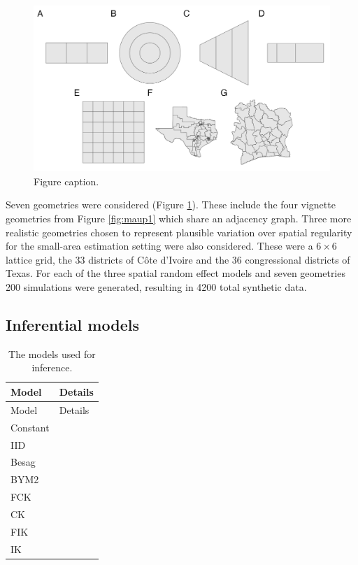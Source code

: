 \documentclass[a4paper, nobind]{templates/ociamthesis}
\begin{document}
\begin{figure}
\includegraphics[width=0.95\linewidth]{figures/beyond-borders/geometries} \caption{Figure caption.}\label{fig:geometries}
\end{figure}

Seven geometries were considered (Figure \ref{fig:geometries}).
These include the four vignette geometries from Figure \ref{fig:maup1} which share an adjacency graph.
Three more realistic geometries chosen to represent plausible variation over spatial regularity for the small-area estimation setting were also considered.
These were a \(6 \times 6\) lattice grid, the 33 districts of Côte d'Ivoire and the 36 congressional districts of Texas.
For each of the three spatial random effect models and seven geometries 200 simulations were generated, resulting in 4200 total synthetic data.

\hypertarget{inferential-models}{%
\subsection{Inferential models}\label{inferential-models}}

\begin{longtable}[]{@{}ll@{}}
\caption{\label{tab:inferential-models} The models used for inference.}\tabularnewline
\toprule\noalign{}
Model & Details \\
\midrule\noalign{}
\endfirsthead
\toprule\noalign{}
Model & Details \\
\midrule\noalign{}
\endhead
\bottomrule\noalign{}
\endlastfoot
Constant & \\
IID & \\
Besag & \\
BYM2 & \\
FCK & \\
CK & \\
FIK & \\
IK & \\
\end{longtable}
\end{document}
